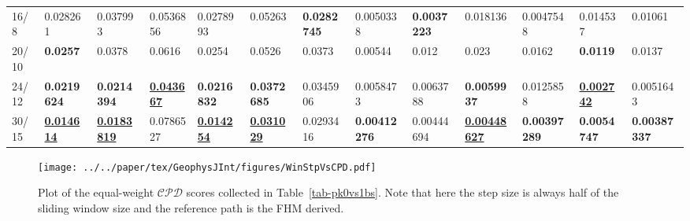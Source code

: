 \begin{landscape}
\begin{table}[tbp]
{\begin{tabular}{@{}lllllllllllll@{}}
16/8 & 0.028261 & 0.037993 & 0.0536856 & 0.0278993 & 0.05263 & {\color[HTML]{34FF34} \textbf{0.0282745}} & 0.0050338 & {\color[HTML]{32CB00} \textbf{0.0037223}} & 0.018136 & 0.0047548 & 0.014537 & 0.01061 \\
20/10 & {\color[HTML]{34FF34} \textbf{0.0257}} & 0.0378 & 0.0616 & 0.0254 & 0.0526 & 0.0373 & 0.00544 & 0.012 & 0.023 & 0.0162 & {\color[HTML]{34FF34} \textbf{0.0119}} & 0.0137 \\
24/12 & {\color[HTML]{32CB00} \textbf{0.0219624}} & {\color[HTML]{32CB00} \textbf{0.0214394}} & {\color[HTML]{009901} {\ul\textbf{0.043667}}} & {\color[HTML]{32CB00} \textbf{0.0216832}} & {\color[HTML]{32CB00} \textbf{0.0372685}} & 0.0345906 & 0.0058473 & 0.0063788 & {\color[HTML]{32CB00} \textbf{0.0059937}} & 0.0125858 & {\color[HTML]{009901} {\ul\textbf{0.002742}}} & 0.0051643 \\
30/15 & {\color[HTML]{009901} {\ul\textbf{0.014614}}} & {\color[HTML]{009901} {\ul\textbf{0.0183819}}} & 0.0786527 & {\color[HTML]{009901} {\ul\textbf{0.014254}}} & {\color[HTML]{009901} {\ul\textbf{0.031029}}} & 0.0293416 & {\color[HTML]{34FF34} \textbf{0.00412276}} & 0.00444694 & {\color[HTML]{009901} {\ul\textbf{0.00448627}}} & {\color[HTML]{32CB00} \textbf{0.00397289}} & {\color[HTML]{32CB00} \textbf{0.0054747}} & {\color[HTML]{32CB00} \textbf{0.00387337}} \\ \bottomrule
\end{tabular}%
}
\end{table}
\end{landscape}

\begin{figure}[!ht]
  \centering
  \texttt{[image: ../../paper/tex/GeophysJInt/figures/WinStpVsCPD.pdf]}
  \caption[Sliding window and step sizes vs $\mathcal{CPD}$]{Plot of the
    equal-weight $\mathcal{CPD}$ scores collected in Table~\ref{tab-pk0vs1bs}.
    Note that here the step size is always half of the sliding window size and
    the reference path is the FHM derived.}\label{fig-WinStpVsCPD}
\end{figure}


